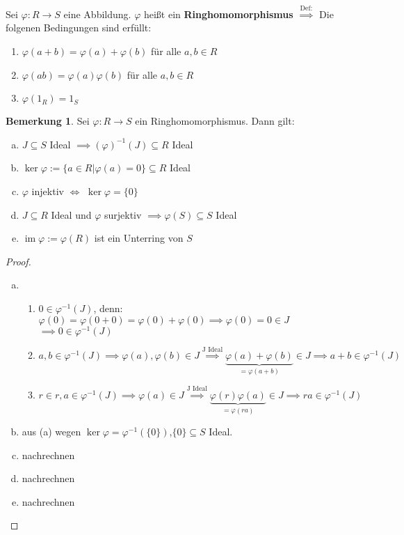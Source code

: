 \documentclass[a4paper, titlepage]{article}
\theoremstyle{definition}
\newtheorem{bem}[satz]{Bemerkung}
\begin{document}
\begin{definition}
	Sei $\varphi: R \longrightarrow S$ eine Abbildung. $\varphi$ heißt ein \textbf{Ringhomomorphismus} $\overset{\text{Def:}}{\implies}$ Die folgenen Bedingungen sind erfüllt:
	\begin{enumerate}[(RH1)]
		\item $\varphi(a+b)=\varphi(a)+\varphi(b)$ für alle $a,b \in R$
		\item $\varphi(ab)=\varphi(a)\varphi(b)$ für alle $a,b\in R$
		\item $\varphi(1_R)=1_S$
	\end{enumerate}
\end{definition}
\begin{bem}
	Sei $\varphi:R\longrightarrow S$ ein Ringhomomorphismus. Dann gilt:
		\begin{enumerate}[(a)]
			\item $J\subseteq S$ Ideal $\implies (\varphi)^{-1}(J)\subseteq R$ Ideal
			\item $\ker \varphi:=\{a\in R |  \varphi(a)=0\}\subseteq R$ Ideal
			\item $\varphi$ injektiv $\Leftrightarrow$ $\ker\varphi = \{0\}$
			\item $J\subseteq R$ Ideal und $\varphi$ surjektiv $\implies \varphi(S)\subseteq S$ Ideal
			\item $\operatorname{im} \varphi:=\varphi(R)$ ist ein Unterring von $S$
		\end{enumerate}
\end{bem}
\begin{proof}
	\begin{enumerate}[(a)]
		\item 
		\begin{enumerate}[(J1)]
			\item $0\in\varphi^{-1}(J)$, denn: $\varphi(0)=\varphi(0+0)=\varphi(0)+\varphi(0)\implies\varphi(0)=0\in J$\\$\implies 0\in \varphi^{-1}(J)$
			\item $a,b\in\varphi^{-1}(J)\implies \varphi(a),\varphi(b)\in J\overset{\text{J Ideal}}{\implies} \underbrace{\varphi(a)+\varphi(b)}_{=\varphi(a+b)}\in J\implies a+b\in\varphi^{-1}(J)$
			\item $r\in r, a \in \varphi^{-1}(J)\implies\varphi(a)\in J\overset{\text{J Ideal}}{\implies}\underbrace{\varphi(r)\varphi(a)}_{=\varphi(ra)}\in J \implies ra\in \varphi^{-1}(J)$
		\end{enumerate}
		\item aus (a) wegen $\ker \varphi=\varphi^{-1}(\{0\})$,$\{0\}\subseteq S$ Ideal.
		\item nachrechnen
		\item nachrechnen
		\item nachrechnen
	\end{enumerate}
\end{proof}
\end{document}

